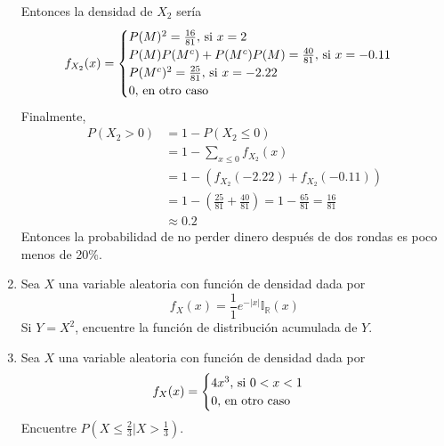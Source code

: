 \documentclass[12pt,a4paper]{report}
\begin{document}
\begin{enumerate}
{			Entonces la densidad de $X_2$ sería
			\[
				f_{X_2}(x) = \begin{cases}
							P(M)^2 = \frac{16}{81}, $ si $ x = 2\\
							P(M)P(M^c) + P(M^c)P(M) = \frac{40}{81}, $ si $ x = -0.11\\
							P(M^c)^2 = \frac{25}{81}, $ si $ x = -2.22\\
							0, $ en otro caso$
						 \end{cases}
			\]
			Finalmente,
			\begin{align*}
				P(X_2 > 0) &= 1 - P(X_2 \leq 0) \\
						 &= 1 - \sum_{x \leq 0}{f_{X_2}(x)}\\
						 &= 1 - (f_{X_2}(-2.22)+f_{X_2}(-0.11))\\
						 &= 1 - (\frac{25}{81} + \frac{40}{81})
						 = 1- \frac{65}{81}
						 = \frac{16}{81}\\
						 &\approx 0.2
			\end{align*}
			Entonces la probabilidad de no perder dinero después de dos rondas
			es poco menos de 20\%.

		}
		\item {
			Sea $X$ una variable aleatoria con función de densidad dada por
			\[f_X(x) = \frac{1}{1}e^{-|x|}\mathbb{I}_{\mathbb{R}}(x)\]
			Si $Y = X^2$, encuentre la función de distribución acumulada de $Y$.
		}
		\item {
			Sea $X$ una variable aleatoria con función de densidad dada por
			\[
				f_X(x) = \begin{cases}
							4x^3, $ si $ 0 < x < 1\\
							0, $ en otro caso$
						 \end{cases}
			\]
			Encuentre $P(X \leq \frac{2}{3}|X > \frac{1}{3})$.
		}
	\end{enumerate}
\end{document}
